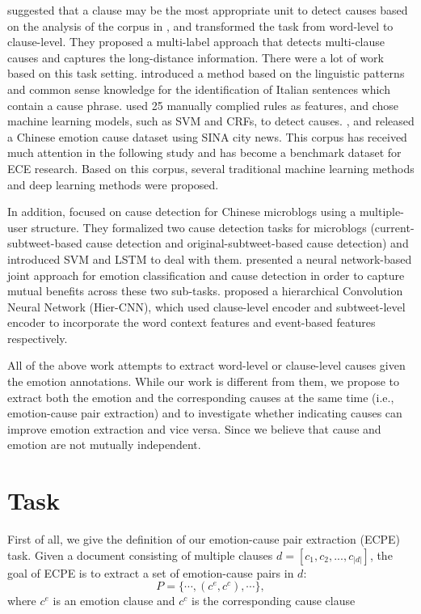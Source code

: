 \documentclass[11pt,a4paper]{article}
\begin{document}
\citet{chen2010emotion} suggested that a clause may be the most appropriate unit to detect causes based on the analysis of the corpus in \cite{lee2010text}, and transformed the task from word-level to clause-level. They proposed a multi-label approach that detects multi-clause causes and captures the long-distance information. There were a lot of work based on this task setting. \citet{russo2011emocause} introduced a method based on the linguistic patterns and common sense knowledge for the identification of Italian sentences which contain a cause phrase. \citet{gui2014emotion} used 25 manually complied rules as features, and chose machine learning models, such as SVM and CRFs, to detect causes. \citet{gui2016event}, \citet{gui2016emotion} and \citet{xu2017ensemble} released a Chinese emotion cause dataset using SINA city news. This corpus has received much attention in the following study and has become a benchmark dataset for ECE research. Based on this corpus, several traditional machine learning methods \cite{gui2016event, gui2016emotion, xu2017ensemble} and  deep learning methods \cite{gui2017question, li2018co, yu2019multiple, xu2019extracting} were proposed.

In addition, \citet{cheng2017emotion} focused on cause detection for Chinese microblogs using a multiple-user structure. They formalized two cause detection tasks for microblogs (current-subtweet-based cause detection and original-subtweet-based cause detection) and introduced SVM and LSTM to deal with them. \citet{chen2018joint} presented a neural network-based joint approach for emotion classification and cause detection in order to capture mutual benefits across these two sub-tasks. \citet{chen2018hierarchical} proposed a hierarchical Convolution Neural Network (Hier-CNN), which used clause-level encoder and subtweet-level encoder to incorporate the word context features and event-based features respectively.

All of the above work attempts to extract word-level or clause-level causes given the emotion annotations.  While our work is different from them, we propose to extract both the emotion and the corresponding causes at the same time (i.e., emotion-cause pair extraction) and to investigate whether indicating causes can improve emotion extraction and vice versa. Since we believe that cause and emotion are not mutually independent.

\section{Task}
First of all, we give the definition of our emotion-cause pair extraction (ECPE) task. Given a document consisting of multiple clauses $ d=[c_1,c_2,...,c_{|d|} ] $,  the goal of ECPE is to extract a set of emotion-cause pairs in $ d $:
\begin{equation}\label{key}
P= \{ \cdots,(c^e,c^c ),\cdots \},
\end{equation}
where $ c^e $ is an emotion clause and $ c^c $ is the corresponding cause clause
\end{document}
